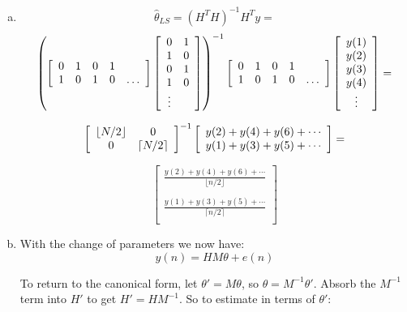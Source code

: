 \documentclass{article}
\begin{document}
\begin{enumerate}[(a)]
\item
\[
\hat{\theta}_{LS} = (H^TH)^{-1}H^Ty =
\]
\[
{\left(
\left[ \begin{array}{c c c c c}
0 & 1 & 0 & 1 & \\
1 & 0 & 1 & 0 & \ldots \\
\end{array} \right]
\left[ \begin{array}{c c}
0 & 1 \\
1 & 0 \\
0 & 1 \\
1 & 0 \\
\vdots \\
\end{array}
\right]
\right)}^{-1}
\left[ \begin{array}{c c c c c}
0 & 1 & 0 & 1 & \\
1 & 0 & 1 & 0 & \ldots \\
\end{array}
\right]
\left[ \begin{array}{c}
y(1)\\
y(2)\\
y(3)\\
y(4)\\
\vdots\\
\end{array} \right]
=
\]

\[
{\left[ \begin{array}{c c}
\lfloor N/2 \rfloor & 0 \\
0 & \lceil N/2 \rceil \\
\end{array} \right]}^{-1}
\left[ \begin{array}{c}
y(2) + y(4) + y(6) + \cdots \\
y(1) + y(3) + y(5) + \cdots\\
\end{array} \right]
=
\]

\[
\left[ \begin{array}{c}
\frac{y(2) + y(4) + y(6) + \cdots}{\lfloor n/2 \rfloor} \\
\\
\frac{y(1) + y(3) + y(5) + \cdots}{\lceil n/2 \rceil} \\
\end{array} \right]
\]
\vspace{6pt}
\item
With the change of parameters we now have:
\[
y(n) = HM\theta + e(n)
\]

To return to the canonical form, let $\theta' = M\theta$, so
$\theta = M^{-1}\theta'$. Absorb the $M^{-1}$ term into $H'$ to get 
$H' = HM^{-1}$. So to estimate in terms of $\theta'$:


\end{enumerate}
\end{document}
